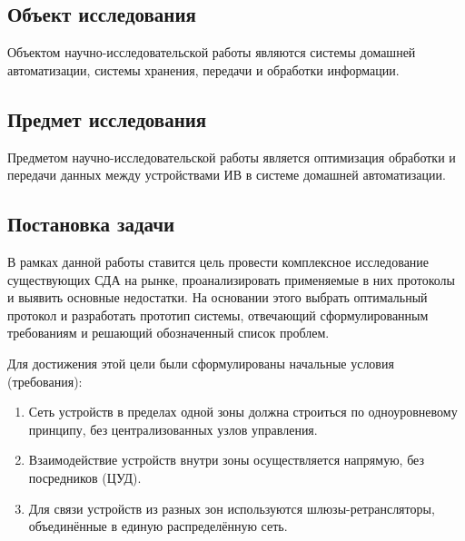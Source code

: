 \documentclass[a4paper,12pt]{article}
\begin{document}
\subsection{Объект исследования}


Объектом научно-исследовательской работы являются системы домашней автоматизации, системы хранения, передачи и обработки информации.


\subsection{Предмет исследования}



Предметом научно-исследовательской работы является оптимизация обработки и передачи данных между устройствами ИВ в системе домашней автоматизации.

\subsection{Постановка задачи}


В рамках данной работы ставится цель провести комплексное исследование существующих СДА на рынке, проанализировать применяемые в них протоколы и выявить основные недостатки. На основании этого выбрать оптимальный протокол и разработать прототип системы, отвечающий сформулированным требованиям и решающий обозначенный список проблем.

Для достижения этой цели были сформулированы начальные условия (требования):

\begin{enumerate}
    \item Сеть устройств в пределах одной зоны должна строиться по одноуровневому принципу, без централизованных узлов управления.
    \item Взаимодействие устройств внутри зоны осуществляется напрямую, без посредников (ЦУД).
    \item Для связи устройств из разных зон используются шлюзы-ретрансляторы, объединённые в единую распределённую сеть.
\end{enumerate}
\end{document}
